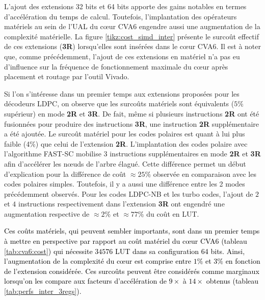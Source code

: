 \documentclass[../main.tex]{subfiles}
\begin{document}
L'ajout des extensions 32 bits et 64 bits apporte des gains notables en termes d'accélération du temps de calcul.
Toutefois, l'implantation des opérateurs matériels au sein de l'UAL du cœur CVA6 engendre aussi une augmentation de la complexité matérielle.
La figure \ref{tikz:cost_simd_inter} présente le surcoût effectif de ces extensions (\textbf{3R}) lorsqu'elles sont insérées dans le cœur CVA6. Il est à noter que, comme précédemment, l'ajout de ces extensions en matériel n'a pas eu d'influence sur la fréquence de fonctionnement maximale du cœur après placement et routage par l'outil Vivado.

Si l'on s'intéresse dans un premier temps aux extensions proposées pour les décodeurs LDPC, on observe que les surcoûts matériels sont équivalents ($5\%$ supérieur) en mode \textbf{2R} et \textbf{3R}. 
De fait, même si plusieurs instructions \textbf{2R} ont été fusionnées pour produire des instructions \textbf{3R}, une instruction \textbf{2R} supplémentaire a été ajoutée. 
Le surcoût matériel pour les codes polaires est quant à lui plus faible (4\%) que celui de l'extension \textbf{2R}.
L'implantation des codes polaire avec l'algorithme FAST-SC mobilise 3 instructions supplémentaires en mode \textbf{2R} et \textbf{3R} afin d'accélérer les nœuds de l'arbre élagué. Cette différence permet un début d'explication pour la différence de coût $\approx 25\%$ observée en comparaison avec les codes polaires simples. Toutefois, il y a aussi une différence entre les 2 modes précédemment observés.
Pour les codes LDPC-NB et les turbo codes, l'ajout de $2$ et $4$ instructions respectivement dans l'extension \textbf{3R} ont engendré une augmentation respective de $\approx 2\%$ et $\approx 77\%$ du coût en LUT.

\textcolor{black}{Ces coûts matériels, qui peuvent sembler importants, sont dans un premier temps à mettre en perspective par rapport au coût matériel du cœur CVA6 (tableau \ref{tab:cva6:cost}) qui nécessite $34576$ LUT dans sa configuration 64 bits.
Ainsi, l'augmentation de la complexité du cœur est comprise entre $1\%$ et $3\%$ en fonction de l'extension considérée.
Ces surcoûts peuvent être considérés comme marginaux lorsqu'on les compare aux facteurs d'accélération de $9\times$ à $14\times$ obtenus (tableau \ref{tab:perfs_inter_3regs}).}
\end{document}
